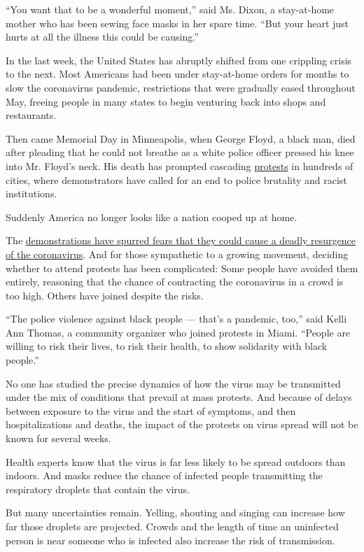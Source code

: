 ``You want that to be a wonderful moment,'' said Ms. Dixon, a
stay-at-home mother who has been sewing face masks in her spare time.
``But your heart just hurts at all the illness this could be causing.''

In the last week, the United States has abruptly shifted from one
crippling crisis to the next. Most Americans had been under stay-at-home
orders for months to slow the coronavirus pandemic, restrictions that
were gradually eased throughout May, freeing people in many states to
begin venturing back into shops and restaurants.

Then came Memorial Day in Minneapolis, when George Floyd, a black man,
died after pleading that he could not breathe as a white police officer
pressed his knee into Mr. Floyd's neck. His death has prompted cascading
\href{https://www.nytimes.com/2020/06/03/us/confederate-statues-george-floyd.html}{protests}
in hundreds of cities, where demonstrators have called for an end to
police brutality and racist institutions.

Suddenly America no longer looks like a nation cooped up at home.

The
\href{https://www.nytimes.com/2020/07/01/nyregion/nyc-coronavirus-protests.html}{demonstrations
have spurred fears that they could cause a deadly resurgence of the
coronavirus}. And for those sympathetic to a growing movement, deciding
whether to attend protests has been complicated: Some people have
avoided them entirely, reasoning that the chance of contracting the
coronavirus in a crowd is too high. Others have joined despite the
risks.

``The police violence against black people --- that's a pandemic, too,''
said Kelli Ann Thomas, a community organizer who joined protests in
Miami. ``People are willing to risk their lives, to risk their health,
to show solidarity with black people.''

No one has studied the precise dynamics of how the virus may be
transmitted under the mix of conditions that prevail at mass protests.
And because of delays between exposure to the virus and the start of
symptoms, and then hospitalizations and deaths, the impact of the
protests on virus spread will not be known for several weeks.

Health experts know that the virus is far less likely to be spread
outdoors than indoors. And masks reduce the chance of infected people
transmitting the respiratory droplets that contain the virus.

But many uncertainties remain. Yelling, shouting and singing can
increase how far those droplets are projected. Crowds and the length of
time an uninfected person is near someone who is infected also increase
the risk of transmission.

